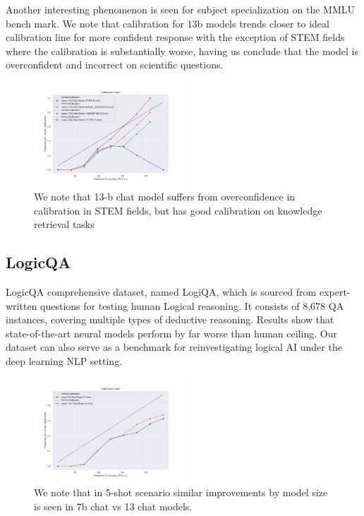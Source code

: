 \documentclass[11pt]{article}
\begin{document}
Another interesting phenomenon is seen for subject specialization on the MMLU bench mark. We note that calibration for 13b models  trends closer to ideal calibration line for more confident response with the exception of STEM fields where the calibration is substantially worse, having us conclude that the model 
is overconfident and incorrect on scientific questions.

\begin{figure}
  \includegraphics[width=0.5\textwidth]{figures/0-shot-13-b-chat-vs-subjects.png}
  \caption{We note that 13-b chat model suffers from overconfidence in calibration in STEM fields, but has good calibration on knowledge retrieval tasks}
  \label{fig:chat-vs-hf}
\end{figure}

\subsection{LogicQA}

LogicQA comprehensive dataset, named LogiQA, which is sourced from expert-written questions for testing human Logical reasoning. It consists of 8,678 QA instances, covering multiple types of deductive reasoning. Results show that state-of-the-art neural models perform by far worse than human ceiling. Our dataset can also serve as a benchmark for reinvestigating logical AI under the deep learning NLP setting. 

\begin{figure}
  \includegraphics[width=0.5\textwidth]{figures/5-shot-7b-13-b-logic-qa.png}
  \caption{We note that in 5-shot scenario similar improvements by model size is seen in 7b chat vs 13 chat models.}
  \label{fig:logicqa-7b-vs-13b-chat}
\end{figure}
\end{document}

